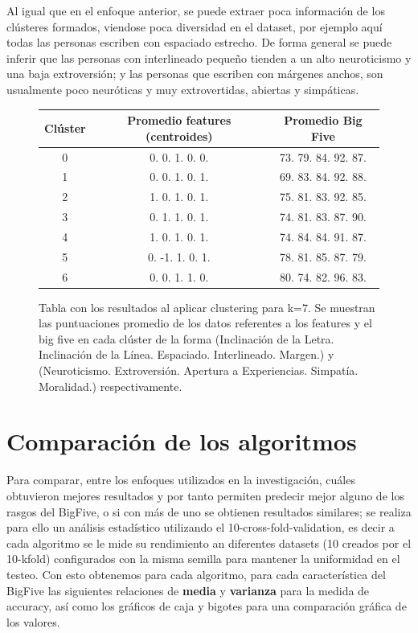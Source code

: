 \documentclass[10pt, a4paper]{article}
\begin{document}
    	Al igual que en el enfoque anterior, se puede extraer poca informaci\'on de los cl\'usteres formados, viendose poca diversidad en el dataset, por ejemplo aqu\'i todas las personas escriben con espaciado estrecho. De forma general se puede inferir que las personas con interlineado peque\~no tienden a un alto neuroticismo y una baja extroversi\'on; y las personas que escriben con m\'argenes anchos, son usualmente poco neur\'oticas y muy extrovertidas, abiertas y simp\'aticas.
    	
    \begin{figure}[H]
    	\centering
    		\begin{tabular}[H]{|c|c|c|}
    		\hline Cl\'uster & Promedio features (centroides) & Promedio Big Five  \\  
    		\hline 0 & 0. 0.  1.  0. 0. & 73. 79. 84. 92. 87. \\
    		\hline 1 & 0.  0.  1.  0.  1. & 69. 83. 84. 92. 88.\\
    		\hline 2 &  1.  0.  1. 0.  1. & 75. 81. 83. 92. 85. \\
    		\hline 3 & 0. 1. 1. 0. 1. & 74. 81. 83. 87. 90. \\
    		\hline 4 & 1. 0.  1.  0.  1. & 74. 84. 84. 91. 87. \\
    		\hline 5 &  0. -1. 1.  0.  1. & 78. 81. 85. 87. 79. \\
    		\hline 6 & 0. 0. 1.  1. 0. & 80. 74. 82. 96. 83. \\
    		\hline
    	\end{tabular}
    \caption{Tabla con los resultados al aplicar clustering para k=7. Se muestran las puntuaciones promedio de los datos referentes a los features y el big five en cada cl\'uster de la forma (Inclinaci\'on de la Letra. Inclinaci\'on de la L\'inea. Espaciado. Interlineado. Margen.) y (Neuroticismo. Extroversi\'on. Apertura a Experiencias. Simpat\'ia. Moralidad.) respectivamente.}
    \end{figure}
    
    \section{Comparaci\'on de los algoritmos}
        Para comparar, entre los enfoques utilizados en la investigaci\'on, cu\'ales obtuvieron mejores resultados y por tanto permiten predecir mejor alguno de los rasgos
        del BigFive, o si con m\'as de uno se obtienen resultados similares; se realiza para ello un an\'alisis estad\'istico utilizando el 10-cross-fold-validation, es decir a cada algoritmo se 
        le mide su rendimiento an diferentes datasets (10 creados por el 10-kfold) configurados con la misma semilla para mantener la uniformidad en el testeo. Con esto 
        obtenemos para cada algoritmo, para cada caracter\'istica del BigFive las siguientes relaciones de \textbf{media} y \textbf{varianza} para la medida de accuracy, 
        as\'i como los gr\'aficos de caja y bigotes para una comparaci\'on gr\'afica de los valores. 
\end{document}
